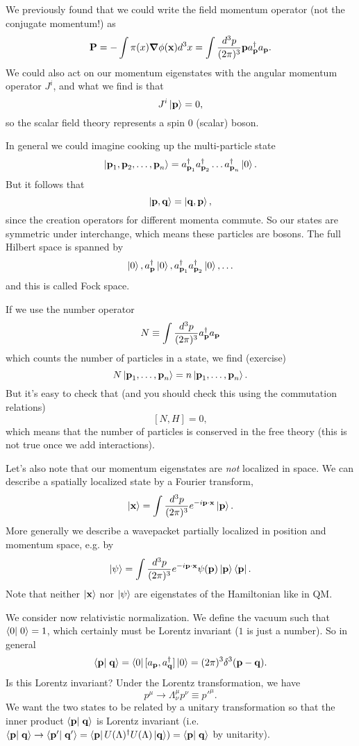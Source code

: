 We previously found that we could write the field momentum operator (not the conjugate momentum!) as
$$\boldsymbol{\mathbf{P}}=-\int \pi(x) \mbox{\boldmath$ \nabla $} \phi(\boldsymbol{\mathbf{x}}) d^3x = \int \frac{d^3p}{(2\pi)^3} \boldsymbol{\mathbf{ p}} a_{\boldsymbol{\mathbf{p}}}^\dagger a_{\boldsymbol{\mathbf{p}}}.$$
We could also act on our momentum eigenstates with the angular momentum operator $J^i$, and what we find is that 
$$J^i\left| \boldsymbol{\mathbf{p}} \right>=0,$$
so the scalar field theory represents a spin $0$ (scalar) boson.

In general we could imagine cooking up the multi-particle state
$$\left| \boldsymbol{\mathbf{p}}_1,\boldsymbol{\mathbf{p}}_2,\ldots,\boldsymbol{\mathbf{p}}_n \right>=a_{\boldsymbol{\mathbf{p}}_1}^\dagger a_{\boldsymbol{\mathbf{p}}_2}^\dagger \ldots a_{\boldsymbol{\mathbf{p}}_n}^\dagger \left| 0 \right>.$$
But it follows that
$$\left| \boldsymbol{\mathbf{p}}, \boldsymbol{\mathbf{q}} \right>=\left| \boldsymbol{\mathbf{q}},\boldsymbol{\mathbf{p}} \right>,$$
since the creation operators for different momenta commute. So our states are symmetric under interchange, which means these particles are bosons. The full Hilbert space is spanned by
$$\left| 0 \right>,a_{\boldsymbol{\mathbf{p}}}^\dagger \left| 0 \right>, a_{\boldsymbol{\mathbf{p}}_1}^\dagger a_{\boldsymbol{\mathbf{p}}_2}^\dagger\left| 0 \right>, \ldots$$
and this is called Fock space.

If we use the number operator
$$N\equiv \int \frac{d^3p}{(2\pi)^3} a_{\boldsymbol{\mathbf{p}}}^\dagger a_{\boldsymbol{\mathbf{p}}}$$
which counts the number of particles in a state, we find (exercise)
$$N\left| \boldsymbol{\mathbf{p}}_1, \ldots ,\boldsymbol{\mathbf{p}}_n \right>=n \left| \boldsymbol{\mathbf{p}}_1, \ldots ,\boldsymbol{\mathbf{p}}_n \right>.$$
But it's easy to check that (and you should check this using the commutation relations) $$[N,H]=0,$$
which means that the number of particles is conserved in the free theory (this is not true once we add interactions).

Let's also note that our momentum eigenstates are \emph{not} localized in space. We can describe a spatially localized state by a Fourier transform,
$$\left| \boldsymbol{\mathbf{x}} \right> = \int \frac{d^3 p}{(2\pi)^3} e^{-i \boldsymbol{\mathbf{p}} \cdot \boldsymbol{\mathbf{x}}} \left| \boldsymbol{\mathbf{p}} \right>.$$
More generally we describe a wavepacket partially localized in position and momentum space, e.g. by 
$$\left| \psi \right> = \int\frac{d^3p}{(2\pi)^3} e^{-i\boldsymbol{\mathbf{p}} \cdot \boldsymbol{\mathbf{x}}} \psi(\boldsymbol{\mathbf{p}})\left| \boldsymbol{\mathbf{p}} \right>\left< \boldsymbol{\mathbf{p}} \right|.$$
Note that neither $\left| \boldsymbol{\mathbf{x}} \right>$ nor $\left| \psi \right>$ are eigenstates of the Hamiltonian like in QM.

We consider now relativistic normalization. We define the vacuum such that $\braket{0}{0}=1$, which certainly must be Lorentz invariant ($1$ is just a number). So in general 
$$\braket{\vec p}{\vec q}=\bra{0}[a_{\pv},a_{\vec q}^\dagger] \ket{0}=(2\pi)^3 \delta^3(\vec p - \vec q).$$
Is this Lorentz invariant? Under the Lorentz transformation, we have $$p^\mu \to \Lambda^\mu_\nu p^\nu \equiv {p'}^\mu.$$
We want the two states to be related by a unitary transformation so that the inner product $\braket{\vec p}{\vec q}$ is Lorentz invariant (i.e. $\braket{\vec p}{\vec q}\to \braket{\vec p'}{\vec q'}=\bra{\pv}U(\Lambda)^\dagger U(\Lambda)\ket{\vec q})=\braket{\vec p}{\vec q}$ by unitarity).

